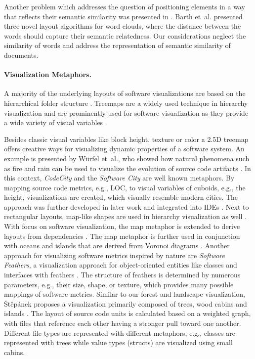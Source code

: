 \documentclass[a4paper,twoside]{article}
\begin{document}
Another problem which addresses the question of positioning elements in a way that reflects their semantic similarity was presented in \cite{barth2014semantic}.
Barth et~al. presented three novel layout algorithms for word clouds, where the distance between the words should capture their semantic relatedness.
Our considerations neglect the similarity of words and address the representation of semantic similarity of documents.

\paragraph{Visualization Metaphors.}

A majority of the underlying layouts of software visualizations are based on the hierarchical folder structure \cite{holten2005,bundleview}.
Treemaps are a widely used technique in hierarchy visualization \cite{scheibel2020-treemaptaxonomy} and are prominently used for software visualization as they provide a wide variety of visual variables \cite{limberger2019-softwaremap}.

Besides classic visual variables like block height, texture or color a 2.5D treemap offers creative ways for visualizing dynamic properties of a software system.
An example is presented by W{\"u}rfel et~al., who showed how natural phenomena such as fire and rain can be used to visualize the evolution of source code artifacts \cite{wurfel2015natural}.
In this context, \emph{CodeCity} \cite{Wettel2007SoftwareCities} and the \emph{Software City} \cite{steinbruckner2013-evolution} are well known metaphors.
By mapping source code metrics, e.g., \ac{LOC}, to visual variables of cuboids, e.g., the height, visualizations are created, which visually resemble modern cities.
The approach was further developed in later work and integrated into IDEs \cite{balogh2015-codemetropolis}.
Next to rectangular layouts, map-like shapes are used in hierarchy visualization as well \cite{auber2013-gospermap}.
With focus on software visualization, the map metaphor is extended to derive layouts from dependencies \cite{hawes2015-codesurveyor}.
The map metaphor is further used in conjunction with oceans and islands that are derived from Voronoi diagrams \cite{schreiber2018-islandmetaphor}.
Another approach for visualizing software metrics inspired by nature are \emph{Software Feathers}, a visualization approach for object-oriented entities like classes and interfaces with feathers \cite{beck2014-feathers}.
The structure of feathers is determined by numerous parameters, e.g., their size, shape, or texture, which provides many possible mappings of software metrics.
Similar to our forest and landscape visualization, \v{S}t\v{e}p\'{a}nek proposes a visualization primarily composed of trees, wood cabins and islands \cite{stepanek2020-landscapesthesis}.
The layout of source code units is calculated based on a weighted graph, with files that reference each other having a stronger pull toward one another.
Different file types are represented with different metaphors, e.g., classes are represented with trees while value types (structs) are visualized using small cabins.
\end{document}
